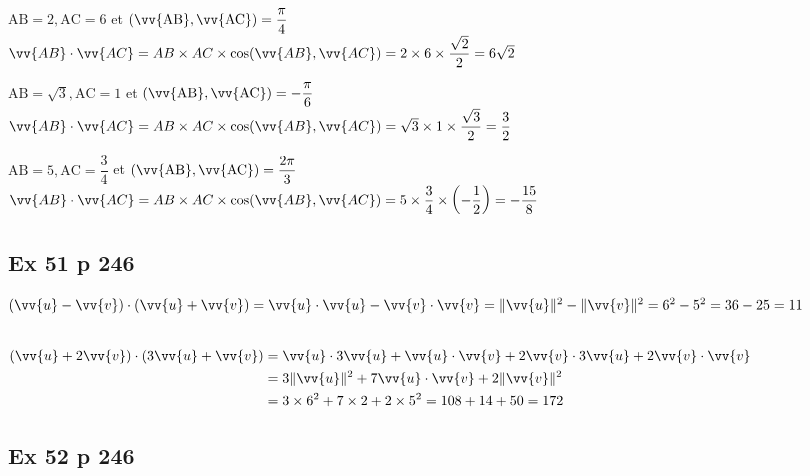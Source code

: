 \documentclass[12pt,a4paper]{book}
\begin{document}
\begin{enumMet}
    \item $\mathrm{AB}=2, \mathrm{AC}=6$ et $(\vv{\mathrm{AB}}, \vv{\mathrm{AC}})=\dfrac{\pi}{4}$\\
    $\vv{AB}\cdot\vv{AC}=AB\times AC\times\cos(\vv{AB},\vv{AC})=2\times6\times\dfrac{\sqrt{2}}{2}=6\sqrt{2}$
    \item $\mathrm{AB}=\sqrt{3}, \mathrm{AC}=1$ et $(\vv{\mathrm{AB}}, \vv{\mathrm{AC}})=-\dfrac{\pi}{6}$\\
    $\vv{AB}\cdot\vv{AC}=AB\times AC\times\cos(\vv{AB},\vv{AC})=\sqrt{3}\times1\times\dfrac{\sqrt{3}}{2}=\dfrac{3}{2}$
    \item $\mathrm{AB}=5, \mathrm{AC}=\dfrac{3}{4}$ et $(\vv{\mathrm{AB}}, \vv{\mathrm{AC}})=\dfrac{2 \pi}{3}$\\
    $\vv{AB}\cdot\vv{AC}=AB\times AC\times\cos(\vv{AB},\vv{AC})=5\times\dfrac{3}{4}\times\left(-\dfrac{1}{2}\right)=-\dfrac{15}{8}$
\end{enumMet}

\subsection*{Ex 51 p 246}

\begin{enumMet}
    \item
    \item
    \item $( \vv{u}- \vv{v}) \cdot( \vv{u}+ \vv{v}) = \vv{u} \cdot  \vv{u}- \vv{v} \cdot  \vv{v} =\| \vv{u}\|^{2}-\| \vv{v}\|^{2}=6^{2}-5^{2}=36-25=11$
    \item \ \\
    $\begin{aligned}( \vv{u}+2  \vv{v}) \cdot(3  \vv{u}+ \vv{v}) &= \vv{u} \cdot 3  \vv{u}+ \vv{u} \cdot  \vv{v}+2  \vv{v} \cdot 3  \vv{u}+2  \vv{v} \cdot  \vv{v} \\ &=3\| \vv{u}\|^{2}+7  \vv{u} \cdot  \vv{v}+2\| \vv{v}\|^{2} \\ &=3 \times 6^{2}+7 \times 2+2 \times 5^{2}=108+14+50=172 \end{aligned}$
\end{enumMet}

\subsection*{Ex 52 p 246}
\end{document}
